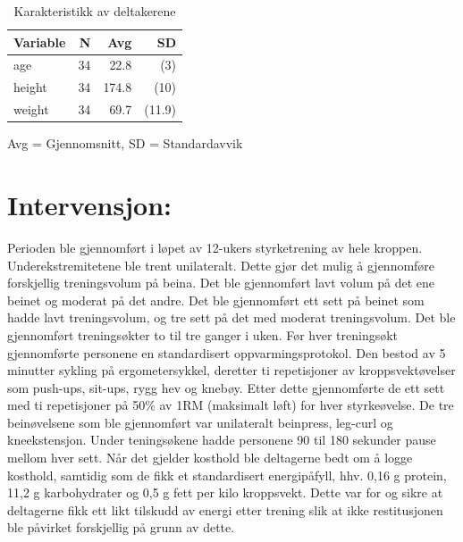 \documentclass[
  letterpaper,
  DIV=11,
  numbers=noendperiod]{scrreprt}
\begin{document}
\begingroup
\fontsize{12.0pt}{14.4pt}\selectfont
\setlength{\LTpost}{0mm}

\begin{longtable}{lrrr}

\caption{\label{tbl-kar}Karakteristikk av deltakerene}

\tabularnewline

\toprule
Variable & N & Avg & SD \\ 
\midrule\addlinespace[2.5pt]
age & 34 & 22.8 & (3) \\ 
height & 34 & 174.8 & (10) \\ 
weight & 34 & 69.7 & (11.9) \\ 
\bottomrule

\end{longtable}

\begin{minipage}{\linewidth}
Avg = Gjennomsnitt, SD = Standardavvik\\
\end{minipage}
\endgroup

\section{Intervensjon:}\label{intervensjon}

Perioden ble gjennomført i løpet av 12-ukers styrketrening av hele
kroppen. Underekstremitetene ble trent unilateralt. Dette gjør det mulig
å gjennomføre forskjellig treningsvolum på beina. Det ble gjennomført
lavt volum på det ene beinet og moderat på det andre. Det ble
gjennomført ett sett på beinet som hadde lavt treningsvolum, og tre sett
på det med moderat treningsvolum. Det ble gjennomført treningsøkter to
til tre ganger i uken. Før hver treningsøkt gjennomførte personene en
standardisert oppvarmingsprotokol. Den bestod av 5 minutter sykling på
ergometersykkel, deretter ti repetisjoner av kroppsvektøvelser som
push-ups, sit-ups, rygg hev og knebøy. Etter dette gjennomførte de ett
sett med ti repetisjoner på 50\% av 1RM (maksimalt løft) for hver
styrkeøvelse. De tre beinøvelsene som ble gjennomført var unilateralt
beinpress, leg-curl og kneekstensjon. Under teningsøkene hadde personene
90 til 180 sekunder pause mellom hver sett. Når det gjelder kosthold ble
deltagerne bedt om å logge kosthold, samtidig som de fikk et
standardisert energipåfyll, hhv. 0,16 g protein, 11,2 g karbohydrater og
0,5 g fett per kilo kroppsvekt. Dette var for og sikre at deltagerne
fikk ett likt tilskudd av energi etter trening slik at ikke
restitusjonen ble påvirket forskjellig på grunn av dette.
\end{document}

